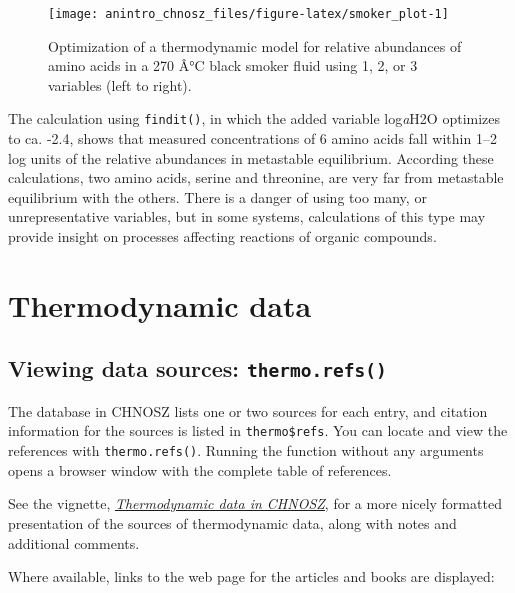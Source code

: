 \documentclass[]{tufte-handout}
\begin{document}
\begin{figure}
\texttt{[image: anintro\_chnosz\_files/figure-latex/smoker\_plot-1]} \caption[Optimization of a thermodynamic model for relative abundances of amino acids in a 270 Â°C black smoker fluid using 1, 2, or 3 variables (left to right)]{Optimization of a thermodynamic model for relative abundances of amino acids in a 270 Â°C black smoker fluid using 1, 2, or 3 variables (left to right).}\label{fig:smoker_plot}
\end{figure}

The calculation using {\texttt{findit()}}, in which the added variable
log\emph{a}H2O optimizes to ca. -2.4, shows that measured concentrations
of 6 amino acids fall within 1--2 log units of the relative abundances
in metastable equilibrium. According these calculations, two amino
acids, serine and threonine, are very far from metastable equilibrium
with the others. There is a danger of using too many, or
unrepresentative variables, but in some systems, calculations of this
type may provide insight on processes affecting reactions of organic
compounds.

\section{Thermodynamic data}\label{thermodynamic-data}

\subsection{\texorpdfstring{Viewing data sources:
{\texttt{thermo.refs()}}}{Viewing data sources: thermo.refs()}}\label{viewing-data-sources-thermo.refs}

The database in CHNOSZ lists one or two sources for each entry, and
citation information for the sources is listed in \texttt{thermo\$refs}.
You can locate and view the references with {\texttt{thermo.refs()}}.
Running the function without any arguments opens a browser window with
the complete table of references.

\begin{marginfigure}
See the vignette, \href{obigt.html}{{\emph{Thermodynamic data in
CHNOSZ}}}, for a more nicely formatted presentation of the sources of
thermodynamic data, along with notes and additional comments.
\end{marginfigure}

Where available, links to the web page for the articles and books are
displayed:
\end{document}

